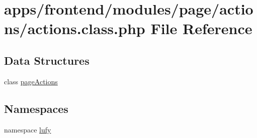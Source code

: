 \hypertarget{frontend_2modules_2page_2actions_2actions_8class_8php}{\section{apps/frontend/modules/page/actions/actions.class.\-php File Reference}
\label{frontend_2modules_2page_2actions_2actions_8class_8php}
}
\subsection*{Data Structures}
\begin{DoxyCompactItemize}
\item 
class \hyperlink{classpage_actions}{page\-Actions}
\end{DoxyCompactItemize}
\subsection*{Namespaces}
\begin{DoxyCompactItemize}
\item 
namespace \hyperlink{namespacelufy}{lufy}
\end{DoxyCompactItemize}
